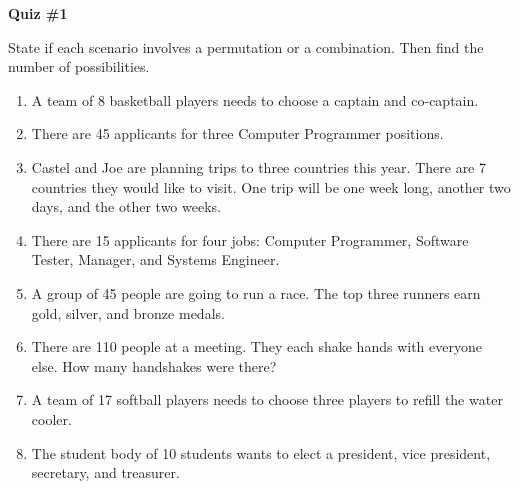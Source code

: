 \begin{center}
\textbf{Quiz \#1}
\end{center} 
\vspce

State if each scenario involves a permutation or a combination. Then find the number of possibilities.

\begin{enumerate}[label = \arabic*. ]
\item A team of 8 basketball players needs to choose a captain and co-captain.
\item There are 45 applicants for three Computer Programmer positions.
\item Castel and Joe are planning trips to three countries this year. There are 7 countries they would like to visit. One trip will be one week long, another two days, and the other two weeks.
\item There are 15 applicants for four jobs: Computer Programmer, Software Tester, Manager, and Systems Engineer.
\item A group of 45 people are going to run a race. The top three runners earn gold, silver, and bronze medals.
\item There are 110 people at a meeting. They each shake hands with everyone else. How many handshakes were there?
\item A team of 17 softball players needs to choose three players to refill the water
cooler.
\item The student body of 10 students wants to elect a president, vice president, secretary,
and treasurer.

\end{enumerate} 